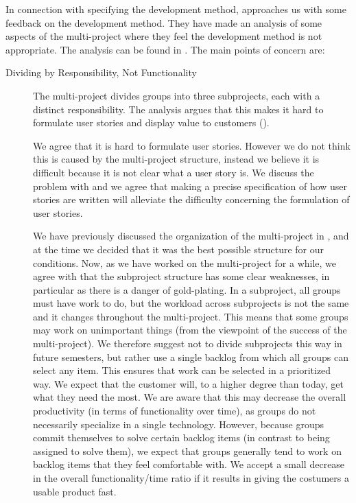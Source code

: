 In connection with specifying the development method,  approaches us with some feedback on the development method. They have made an analysis of some aspects of the multi-project where they feel the development method is not appropriate. The analysis can be found in . The main points of concern are:
\begin{description}
  \item[Dividing by Responsibility, Not Functionality] The multi-project divides groups into three subprojects, each with a distinct responsibility. The analysis argues that this makes it hard to formulate user stories and display value to customers ().

  We agree that it is hard to formulate user stories. However we do not think this is caused by the multi-project structure, instead we believe it is difficult because it is not clear what a user story is. We discuss the problem with  and we agree that making a precise specification of how user stories are written will alleviate the difficulty concerning the formulation of user stories.

  We have previously discussed the organization of the multi-project in , and at the time we decided that it was the best possible structure for our conditions. Now, as we have worked on the multi-project for a while, we agree with  that the subproject structure has some clear weaknesses, in particular as there is a danger of gold-plating. In a subproject, all groups must have work to do, but the workload across subprojects is not the same and it changes throughout the multi-project. This means that some groups may work on unimportant things (from the viewpoint of the success of the multi-project). We therefore suggest not to divide subprojects this way in future semesters, but rather use a single backlog from which all groups can select any item. This ensures that work can be selected in a prioritized way. We expect that the customer will, to a higher degree than today, get what they need the most. We are aware that this may decrease the overall productivity (in terms of functionality over time), as groups do not necessarily specialize in a single technology. However, because groups commit themselves to solve certain backlog items (in contrast to being assigned to solve them), we expect that groups generally tend to work on backlog items that they feel comfortable with. We accept a small decrease in the overall functionality/time ratio if it results in giving the costumers a usable product fast.


\end{description}
